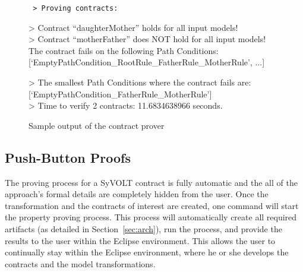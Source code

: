 

\begin{figure}

\scriptsize
\tt
> Proving contracts:

> Contract ``daughterMother'' holds for all input models!
\\
> Contract ``motherFather'' does NOT hold for all input models! The contract
fails on the following Path Conditions:
[`EmptyPathCondition\_RootRule\_FatherRule\_MotherRule', ...]

> The smallest Path Conditions where the contract fails are:
[`EmptyPathCondition\_FatherRule\_MotherRule']
\\
> Time to verify 2 contracts: 11.6834638966 seconds.
\caption{Sample output of the contract prover}
\label{fig:output}
\end{figure}

\subsection{Push-Button Proofs}
\label{sec:push_button_proofs}
The proving process for a SyVOLT contract is fully automatic and the all of the
approach's formal details are completely hidden from the user. Once the
transformation and the contracts of interest are created, one command will start
the property proving process. This process will automatically create all
required artifacts (as detailed in Section~\ref{sec:arch}), run the process, and
provide the results to the user within the Eclipse environment. This allows the user to continually stay within the
Eclipse environment, where he or she develops the contracts and the
model transformations.


